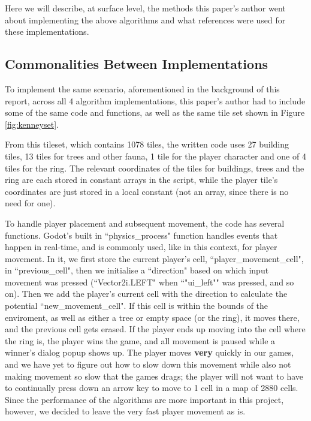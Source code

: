 Here we will describe, at surface level, the methods this paper's author went about implementing the above algorithms and what references were used for these implementations.

\subsection{Commonalities Between Implementations} \label{commonalities}

To implement the same scenario, aforementioned in the background of this report, across all 4 algorithm implementations, this paper's author had to include some of the same code and functions, as well as the same tile set shown in Figure \ref{fig:kenneyset}.

From this tileset, which contains 1078 tiles, the written code uses 27 building tiles, 13 tiles for trees and other fauna, 1 tile for the player character and one of 4 tiles for the ring. The relevant coordinates of the tiles for buildings, trees and the ring are each stored in constant arrays in the script, while the player tile's coordinates are just stored in a local constant (not an array, since there is no need for one).

To handle player placement and subsequent movement, the code has several functions. Godot's built in ``physics\_process" function handles events that happen in real-time, and is commonly used, like in this context, for player movement. In it, we first store the current player's cell, ``player\_movement\_cell", in ``previous\_cell", then we initialise a ``direction" based on which input movement was pressed (``Vector2i.LEFT" when ``"ui\_left"" was pressed, and so on). Then we add the player's current cell with the direction to calculate the potential ``new\_movement\_cell". If this cell is within the bounds of the enviroment, as well as either a tree or empty space (or the ring), it moves there, and the previous cell gets erased. If the player ends up moving into the cell where the ring is, the player wins the game, and all movement is paused while a winner's dialog popup shows up. The player moves \textbf{very} quickly in our games, and we have yet to figure out how to slow down this movement while also not making movement so slow that the games drags; the player will not want to have to continually press down an arrow key to move to 1 cell in a map of 2880 cells. Since the performance of the algorithms are more important in this project, however, we decided to leave the very fast player movement as is.

